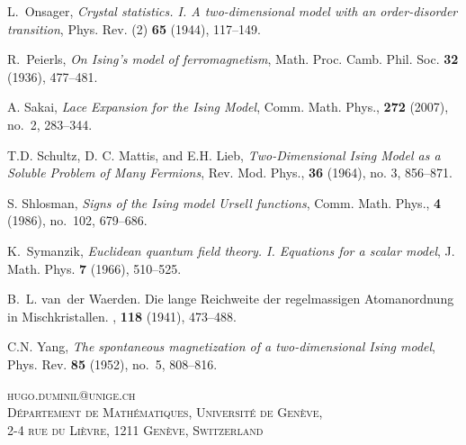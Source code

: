 \documentclass[a4paper,oneside,11pt]{article}
\begin{document}
\begin{thebibliography}{7}

L.~Onsager, \emph{Crystal statistics. {I}. {A} two-dimensional model with an
  order-disorder transition}, Phys. Rev. (2) \textbf{65} (1944), 117--149.

R.~Peierls, \emph{On {I}sing's model of ferromagnetism}, Math. Proc. Camb.
  Phil. Soc. \textbf{32} (1936), 477--481.
  
A. Sakai, {\em Lace Expansion for the Ising Model}, 
Comm. Math. Phys., {\bf 272} (2007), no.~2, 283--344.

T.D. Schultz, D. C. Mattis, and E.H. Lieb, {\em Two-Dimensional Ising Model as a Soluble Problem of Many Fermions}, Rev. Mod. Phys., {\bf 36} (1964), no. 3, 856--871.

S. Shlosman, {\em Signs of the Ising model Ursell functions}, Comm. Math. Phys.,
{\bf 4} (1986), no.~102, 679--686.

%


K.~Symanzik, \emph{Euclidean quantum field theory. {I}. {E}quations for a
  scalar model}, J. Math. Phys. \textbf{7} (1966), 510--525.

B.~L. van~der Waerden.
\newblock Die lange {R}eichweite der regelmassigen {A}tomanordnung in
  {M}ischkristallen.
, {\bf 118} (1941), 473--488.

C.N. Yang, \emph{The spontaneous magnetization of a two-dimensional {I}sing
  model}, Phys. Rev. \textbf{85} (1952), no.~5, 808--816.
\end{thebibliography}
$ $\\
\textsc{hugo.duminil@unige.ch\\
D\'epartement de Math\'ematiques, Universit\'e de Gen\`eve,\\
2-4 rue du Li\`evre, 1211 Gen\`eve, Switzerland}
 
\end{document}
